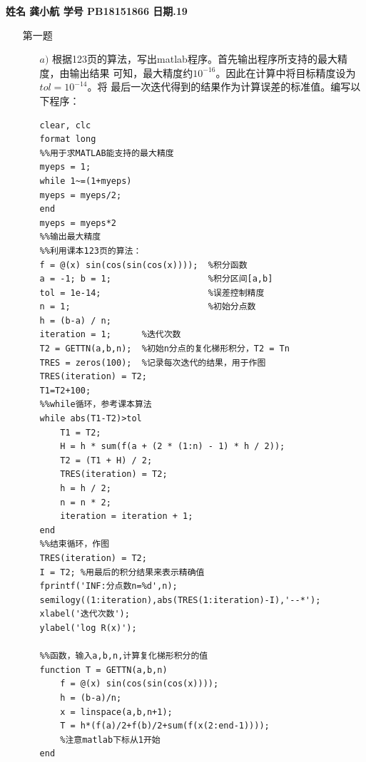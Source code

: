\documentclass[12pt,a4paper,utf8]{ctexart}
\begin{document}


\begin{center}
    \begin{spacing}{2.0}%
        \textbf{}
     \end{spacing}
  
  \textbf{姓名 \quad 龚小航 \qquad  学号 \quad PB18151866  \qquad 日期.19}
\end{center}
\textit{}
\vspace{\baselineskip}

\begin{enumerate}
\item[第一题] 
  \begin{enumerate}
    \item[$a)$] 根据123页的算法，写出matlab程序。首先输出程序所支持的最大精度，由输出结果
                可知，最大精度约$10^{-16}$。因此在计算中将目标精度设为$tol=10^{-14}$。将
                最后一次迭代得到的结果作为计算误差的标准值。编写以下程序：
    \begin{lstlisting}[frame=single]
clear, clc
format long
%%用于求MATLAB能支持的最大精度
myeps = 1;
while 1~=(1+myeps)
myeps = myeps/2;
end
myeps = myeps*2
%%输出最大精度
%%利用课本123页的算法：
f = @(x) sin(cos(sin(cos(x))));  %积分函数
a = -1; b = 1;                   %积分区间[a,b]
tol = 1e-14;                     %误差控制精度
n = 1;                           %初始分点数
h = (b-a) / n;
iteration = 1;      %迭代次数
T2 = GETTN(a,b,n);  %初始n分点的复化梯形积分，T2 = Tn
TRES = zeros(100);  %记录每次迭代的结果，用于作图
TRES(iteration) = T2;
T1=T2+100;
%%while循环，参考课本算法
while abs(T1-T2)>tol   
    T1 = T2;
    H = h * sum(f(a + (2 * (1:n) - 1) * h / 2));
    T2 = (T1 + H) / 2;
    TRES(iteration) = T2;
    h = h / 2;
    n = n * 2;
    iteration = iteration + 1;
end
%%结束循环，作图
TRES(iteration) = T2;
I = T2; %用最后的积分结果来表示精确值
fprintf('INF:分点数n=%d',n);
semilogy((1:iteration),abs(TRES(1:iteration)-I),'--*');
xlabel('迭代次数');
ylabel('log R(x)');

%%函数，输入a,b,n,计算复化梯形积分的值
function T = GETTN(a,b,n)
    f = @(x) sin(cos(sin(cos(x))));
    h = (b-a)/n;
    x = linspace(a,b,n+1);
    T = h*(f(a)/2+f(b)/2+sum(f(x(2:end-1)))); 
	%注意matlab下标从1开始 
end
    \end{lstlisting}
        

\end{enumerate}
\end{enumerate}
\end{document}
